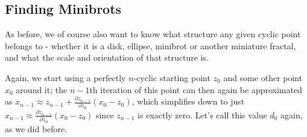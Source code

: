 \documentclass[12pt,a4paper]{article}
\newcommand{\jmat}[2]{\frac{\partial #1}{\partial #2}}
\begin{document}
\subsection{Finding Minibrots}

As before, we of course also want to know what structure any given cyclic point belongs to - whether it is a disk, ellipse, minibrot or another miniature fractal, and what the scale and orientation of that structure is.

Again, we start using a perfectly $n$-cyclic starting point $z_0$ and some other point $x_0$ around it; the $n-1$th iteration of this point can then again be approximated as $x_{n-1} \approx z_{n-1}+\jmat{z_{n-1}}{z_0}(x_0-z_0)$, which simplifies down to just $x_{n-1} \approx \jmat{z_{n-1}}{z_0}(x_0-z_0)$ since $z_{n-1}$ is exactly zero. Let's call this value $d_0$ again, as we did before.
\end{document}
